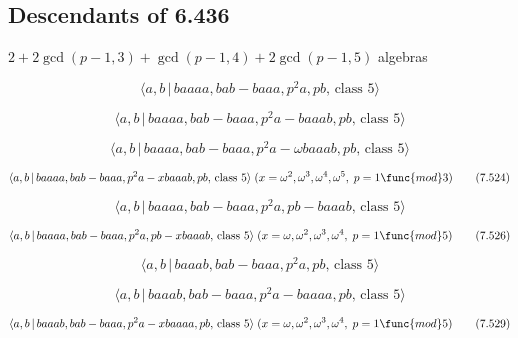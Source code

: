 \documentclass[10pt]{article}
\begin{document}
\subsection{Descendants of 6.436}

$2+2\gcd (p-1,3)+\gcd (p-1,4)+2\gcd (p-1,5)$ algebras

\begin{equation}
\langle a,b\,|\,baaaa,bab-baaa,p^2a,pb,\,\text{class }5\rangle  \tag{7.521}
\end{equation}

\begin{equation}
\langle a,b\,|\,baaaa,bab-baaa,p^2a-baaab,pb,\,\text{class }5\rangle 
\tag{7.522}
\end{equation}

\begin{equation}
\langle a,b\,|\,baaaa,bab-baaa,p^{2}a-\omega baaab,pb,\,\text{class }5\rangle
\tag{7.523}
\end{equation}

\begin{equation}
\langle a,b\,|\,baaaa,bab-baaa,p^{2}a-xbaaab,pb,\,\text{class }5\rangle
\;(x=\omega ^{2},\omega ^{3},\omega ^{4},\omega ^{5},\;p=1\func{mod}3) 
\tag{7.524}
\end{equation}

\begin{equation}
\langle a,b\,|\,baaaa,bab-baaa,p^2a,pb-baaab,\,\text{class }5\rangle 
\tag{7.525}
\end{equation}

\begin{equation}
\langle a,b\,|\,baaaa,bab-baaa,p^{2}a,pb-xbaaab,\,\text{class }5\rangle
\;(x=\omega ,\omega ^{2},\omega ^{3},\omega ^{4},\;p=1\func{mod}5) 
\tag{7.526}
\end{equation}

\begin{equation}
\langle a,b\,|\,baaab,bab-baaa,p^2a,pb,\,\text{class }5\rangle  \tag{7.527}
\end{equation}

\begin{equation}
\langle a,b\,|\,baaab,bab-baaa,p^2a-baaaa,pb,\,\text{class }5\rangle 
\tag{7.528}
\end{equation}

\begin{equation}
\langle a,b\,|\,baaab,bab-baaa,p^{2}a-xbaaaa,pb,\,\text{class }5\rangle
\;(x=\omega ,\omega ^{2},\omega ^{3},\omega ^{4},\;p=1\func{mod}5) 
\tag{7.529}
\end{equation}
\end{document}

